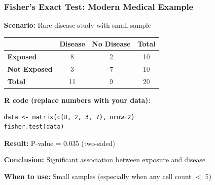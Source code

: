 \documentclass{beamer}
\begin{document}
\begin{frame}[fragile]
\frametitle{Fisher's Exact Test: Modern Medical Example}
\textbf{Scenario:} Rare disease study with small sample

\vspace{0.2cm}
\begin{center}
\begin{tabular}{l|cc|c}
& \textbf{Disease} & \textbf{No Disease} & \textbf{Total} \\
\hline
\textbf{Exposed} & 8 & 2 & 10 \\
\textbf{Not Exposed} & 3 & 7 & 10 \\
\hline
\textbf{Total} & 11 & 9 & 20 \\
\end{tabular}
\end{center}

\vspace{0.3cm}
\textbf{R code (replace numbers with your data):}
\begin{verbatim}
data <- matrix(c(8, 2, 3, 7), nrow=2)
fisher.test(data)
\end{verbatim}

\vspace{0.2cm}
\textbf{Result:} P-value = 0.035 (two-sided)

\vspace{0.2cm}
\textbf{Conclusion:} Significant association between exposure and disease

\vspace{0.2cm}
\textbf{When to use:} Small samples (especially when any cell count $<$ 5)
\end{frame}
\end{document}
